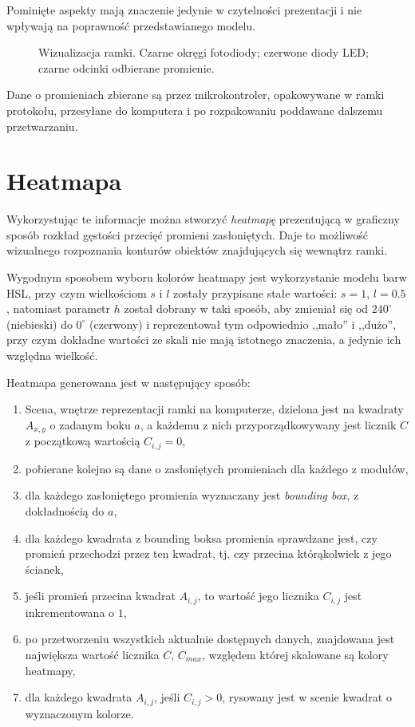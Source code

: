 Pominięte aspekty mają znaczenie jedynie w czytelności prezentacji i nie wpływają na poprawność przedstawianego modelu.

\begin{figure}
 \centering
 \makebox[\textwidth][r]{
  \resizebox{.9\largefigure}{!}{
    \def\svgwidth{0.9\largefigure}
    
  }
 }
 \caption[Wizualizacja ramki]{Wizualizacja ramki. Czarne okręgi \ppauza fotodiody; czerwone \ppauza diody LED; czarne odcinki \ppauza odbierane promienie.}
 \label{fig:scene_rays_sample}
\end{figure}

Dane o promieniach zbierane są przez mikrokontroler, opakowywane w ramki protokołu, przesyłane do komputera i po rozpakowaniu poddawane dalszemu przetwarzaniu.\\

\section{Heatmapa}

Wykorzystując te informacje można stworzyć \textit{heatmapę} prezentującą w graficzny sposób rozkład gęstości przecięć promieni zasłoniętych. Daje to możliwość wizualnego rozpoznania konturów obiektów znajdujących się wewnątrz ramki.

Wygodnym sposobem wyboru kolorów heatmapy jest wykorzystanie modelu barw HSL, przy czym wielkościom $s$ i $l$ zostały przypisane stałe wartości: $s = 1$, $l = 0.5$, natomiast parametr $h$ został dobrany w taki sposób, aby zmieniał się od $240^{\circ}$ (niebieski) do $0^{\circ}$ (czerwony) i reprezentował tym odpowiednio ,,mało'' i ,,dużo'', przy czym dokładne wartości ze skali nie mają istotnego znaczenia, a jedynie ich względna wielkość.

Heatmapa generowana jest w następujący sposób:
\begin{enumerate}
 \item Scena, wnętrze reprezentacji ramki na komputerze, dzielona jest na kwadraty $A_{x,y}$ o zadanym boku $a$, a każdemu z nich przyporządkowywany jest licznik $C$ z początkową wartością $C_{i,j} = 0$,
 \item pobierane kolejno są dane o zasłoniętych promieniach dla każdego z modułów,
 \item dla każdego zasłoniętego promienia wyznaczany jest \textit{bounding box}, z dokładnością do $a$,
 \item dla każdego kwadrata z bounding boksa promienia sprawdzane jest, czy promień przechodzi przez ten kwadrat, tj. czy przecina którąkolwiek z jego ścianek,
 \item jeśli promień przecina kwadrat $A_{i,j}$, to wartość jego licznika $C_{i,j}$ jest inkrementowana o $1$,
 \item po przetworzeniu wszystkich aktualnie dostępnych danych, znajdowana jest największa wartość licznika $C$, $C_{max}$, względem której skalowane są kolory heatmapy,
 \item dla każdego kwadrata $A_{i,j}$, jeśli $C_{i,j} > 0$, rysowany jest w scenie kwadrat o wyznaczonym kolorze.
\end{enumerate}

